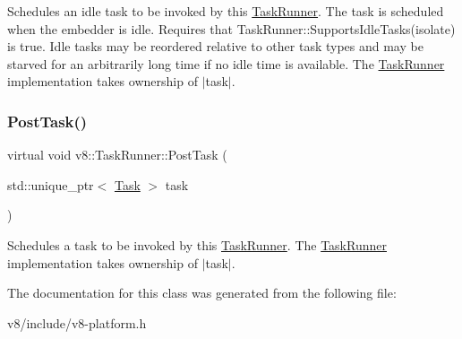 Schedules an idle task to be invoked by this \mbox{\hyperlink{classv8_1_1TaskRunner}{Task\+Runner}}. The task is scheduled when the embedder is idle. Requires that Task\+Runner\+::\+Supports\+Idle\+Tasks(isolate) is true. Idle tasks may be reordered relative to other task types and may be starved for an arbitrarily long time if no idle time is available. The \mbox{\hyperlink{classv8_1_1TaskRunner}{Task\+Runner}} implementation takes ownership of $\vert$task$\vert$. \mbox{\label{classv8_1_1TaskRunner_a755795cc77383daf067a17673569c685}} 
\subsubsection{\texorpdfstring{Post\+Task()}{PostTask()}}
{\footnotesize\ttfamily virtual void v8\+::\+Task\+Runner\+::\+Post\+Task (\begin{DoxyParamCaption}\item[{std\+::unique\+\_\+ptr$<$ \mbox{\hyperlink{classv8_1_1Task}{Task}} $>$}]{task }\end{DoxyParamCaption})\hspace{0.3cm}{\ttfamily [pure virtual]}}

Schedules a task to be invoked by this \mbox{\hyperlink{classv8_1_1TaskRunner}{Task\+Runner}}. The \mbox{\hyperlink{classv8_1_1TaskRunner}{Task\+Runner}} implementation takes ownership of $\vert$task$\vert$. 

The documentation for this class was generated from the following file\+:\begin{DoxyCompactItemize}
\item 
v8/include/v8-\/platform.\+h\end{DoxyCompactItemize}
